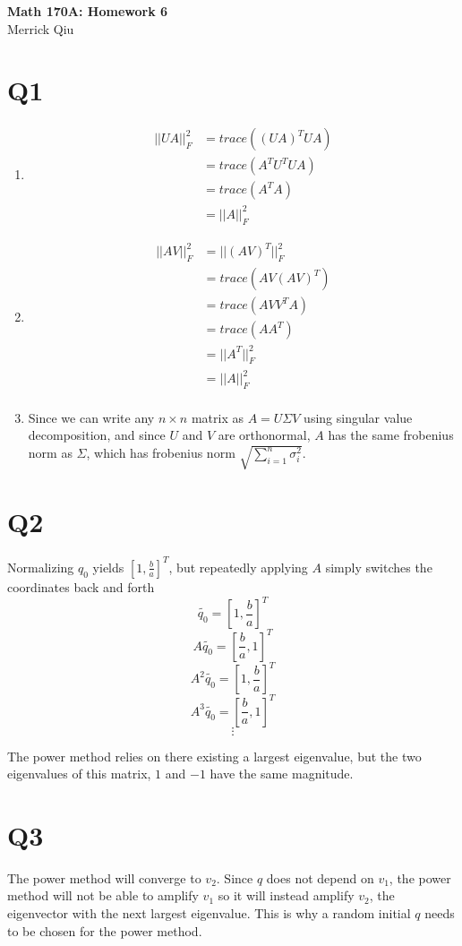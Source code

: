 \documentclass{article}
\begin{document}
\begin{center}
	\huge{\bf Math 170A: Homework 6} \\
	Merrick Qiu
\end{center}

\section*{Q1}
\begin{enumerate}
    \item 
    \begin{align*}
        ||UA||_F^2 &= trace((UA)^TUA) \\
        &= trace(A^TU^TUA) \\
        &= trace(A^TA)\\
        &= ||A||_F^2
    \end{align*}
    \item 
    \begin{align*}
        ||AV||_F^2 &= ||(AV)^T||_F^2  \\
        &= trace(AV(AV)^T) \\
        &= trace(AVV^TA) \\
        &= trace(AA^T) \\
        &= ||A^T||_F^2 \\
        &= ||A||_F^2 \\
    \end{align*}
    \item Since we can write any $n \times n$ matrix as 
    $A = U\Sigma V$ using singular value decomposition,
    and since $U$ and $V$ are orthonormal, $A$ has the same 
    frobenius norm as $\Sigma$, which has frobenius norm 
    $\sqrt{\sum_{i=1}^n \sigma_i^2}$.
\end{enumerate}
\newpage 

\section*{Q2}
Normalizing $q_0$ yields $[1, \frac{b}{a}]^T$, but repeatedly
applying $A$ simply switches the coordinates back and forth
\[
    \tilde{q_0} = [1, \frac{b}{a}]^T
\]
\[
    A\tilde{q_0} = [\frac{b}{a},1]^T
\]
\[
    A^2\tilde{q_0} = [1, \frac{b}{a}]^T
\]
\[
    A^3\tilde{q_0} = [\frac{b}{a},1]^T
\]
\[
    \vdots
\]

The power method relies on there existing a largest eigenvalue,
but the two eigenvalues of this matrix, $1$ and $-1$ have the same magnitude.
\newpage 

\section*{Q3}
The power method will converge to $v_2$.
Since $q$ does not depend on $v_1$, the power method will 
not be able to amplify $v_1$ so it will instead amplify $v_2$,
the eigenvector with the next largest eigenvalue.
This is why a random initial $q$ needs to be chosen for the power method.
\newpage 
\end{document}
